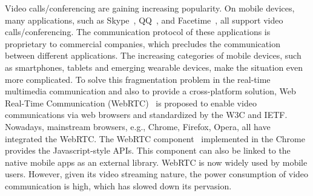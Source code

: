 Video calls/conferencing are gaining increasing popularity.  On mobile
devices, many applications, such as Skype~\cite{skype}, QQ~\cite{qq},
and Facetime~\cite{facetime}, all support video
calls/conferencing. The communication protocol of these applications
is proprietary to commercial companies, which precludes the
communication between different applications.  The increasing
categories of mobile devices, such as smartphones, tablets and
emerging wearable devices, make the situation even more
complicated. To solve this fragmentation problem in the real-time
multimedia communication and also to provide a cross-platform
solution, Web Real-Time Communication (WebRTC)~\cite{webrtcstandard}
is proposed to enable video communications via web browsers and
standardized by the W3C and IETF. Nowadays, mainstream browsers, e.g.,
Chrome, Firefox, Opera, all have integrated the WebRTC. The WebRTC
component~\cite{webrtcproject} implemented in the Chrome provides the
Javascript-style APIs. This component can also be linked to the native
mobile apps as an external library.  WebRTC is now widely used by
mobile users. However, given its video streaming nature, the power
consumption of video communication is high, which has slowed down its
pervasion.






